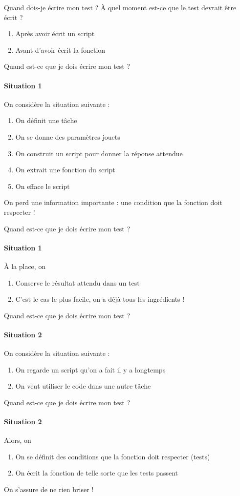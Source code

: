 \documentclass[11pt]{beamer}
\begin{document}
\begin{frame}{Quand dois-je écrire mon test ?}
À quel moment est-ce que le test devrait être écrit ?
\begin{enumerate}
\item Après avoir écrit un script
\item Avant d'avoir écrit la fonction
\end{enumerate}
\end{frame}

\begin{frame}{Quand est-ce que je dois écrire mon test ?}
\framesubtitle{Situation 1}
On considère la situation suivante :
\begin{enumerate}
\item On définit une tâche
\item On se donne des paramètres jouets
\item On construit un script pour donner la réponse attendue
\item On extrait une fonction du script
\item On efface le script
\end{enumerate}
On perd une information importante : une condition que la fonction doit respecter !
\end{frame}

\begin{frame}{Quand est-ce que je dois écrire mon test ?}
\framesubtitle{Situation 1}
À la place, on
\begin{enumerate}
\item Conserve le résultat attendu dans un test
\item C'est le cas le plus facile, on a déjà tous les ingrédients !
\end{enumerate}
\end{frame}

\begin{frame}{Quand est-ce que je dois écrire mon test ?}
\framesubtitle{Situation 2}
On considère la situation suivante :
\begin{enumerate}
\item On regarde un script qu'on a fait il y a longtemps
\item On veut utiliser le code dans une autre tâche
\end{enumerate}
\end{frame}

\begin{frame}{Quand est-ce que je dois écrire mon test ?}
\framesubtitle{Situation 2}
Alors, on
\begin{enumerate}
\item On se définit des conditions que la fonction doit respecter (tests)
\item On écrit la fonction de telle sorte que les tests passent
\end{enumerate}
On s'assure de ne rien briser !
\end{frame}
\end{document}
